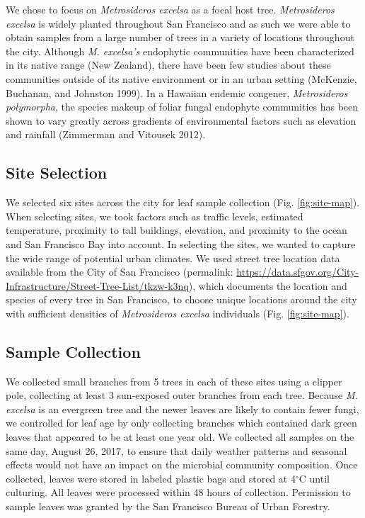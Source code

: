 \documentclass[fleqn,10pt,lineno]{wlpeerj} %
\begin{document}
We chose to focus on \emph{Metrosideros excelsa} as a focal host tree. \emph{Metrosideros excelsa} is widely planted throughout San Francisco and as such we were able to obtain samples from a large number of trees in a variety of locations throughout the city. Although \emph{M. excelsa's} endophytic communities have been characterized in its native range (New Zealand), there have been few studies about these communities outside of its native environment or in an urban setting (McKenzie, Buchanan, and Johnston 1999). In a Hawaiian endemic congener, \emph{Metrosideros polymorpha}, the species makeup of foliar fungal endophyte communities has been shown to vary greatly across gradients of environmental factors such as elevation and rainfall (Zimmerman and Vitousek 2012).

\hypertarget{site-selection}{%
\subsection*{Site Selection}\label{site-selection}}

We selected six sites across the city for leaf sample collection (Fig. \ref{fig:site-map}). When selecting sites, we took factors such as traffic levels, estimated temperature, proximity to tall buildings, elevation, and proximity to the ocean and San Francisco Bay into account. In selecting the sites, we wanted to capture the wide range of potential urban climates. We used street tree location data available from the City of San Francisco (permalink: \url{https://data.sfgov.org/City-Infrastructure/Street-Tree-List/tkzw-k3nq}), which documents the location and species of every tree in San Francisco, to choose unique locations around the city with sufficient densities of \emph{Metrosideros excelsa} individuals (Fig. \ref{fig:site-map}).

\hypertarget{sample-collection}{%
\subsection*{Sample Collection}\label{sample-collection}}

We collected small branches from 5 trees in each of these sites using a clipper pole, collecting at least 3 sun-exposed outer branches from each tree. Because \emph{M. excelsa} is an evergreen tree and the newer leaves are likely to contain fewer fungi, we controlled for leaf age by only collecting branches which contained dark green leaves that appeared to be at least one year old. We collected all samples on the same day, August 26, 2017, to ensure that daily weather patterns and seasonal effects would not have an impact on the microbial community composition. Once collected, leaves were stored in labeled plastic bags and stored at 4\(^{\circ}\)C until culturing. All leaves were processed within 48 hours of collection. Permission to sample leaves was granted by the San Francisco Bureau of Urban Forestry.
\end{document}
